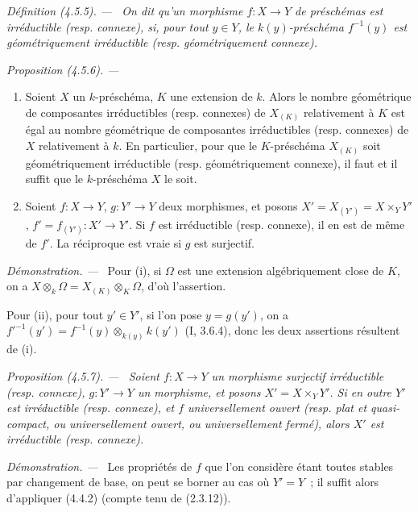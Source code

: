 \documentclass[10pt,oneside]{book}
\newenvironment{definition}[1][]{%
  \par\medskip\noindent\itshape Définition (#1). ---\ }{\par}
\newenvironment{proposition}[1][]{%
  \par\medskip\noindent\itshape Proposition (#1). ---\ }{\par}
\newenvironment{proof}{%
  \par\medskip\noindent\textit{Démonstration. ---\ }}{\par}
\begin{document}
\begin{definition}[4.5.5]
\label{IV.2.4.5.5-fr}
On dit qu'un morphisme $f:X\to Y$ de préschémas est \emph{irréductible}
(resp. \emph{connexe}), si, pour tout $y\in Y$, le $k(y)$-préschéma
$f^{-1}(y)$ est géométriquement irréductible (resp. géométriquement connexe).
\end{definition}

\begin{proposition}[4.5.6]
\label{IV.2.4.5.6-fr}
\begin{enumerate}
\item[(i)] Soient $X$ un $k$-préschéma, $K$ une extension de $k$. Alors le
nombre géométrique de composantes irréductibles (resp. connexes) de $X_{(K)}$
relativement à $K$ est égal au nombre géométrique de composantes irréductibles
(resp. connexes) de $X$ relativement à $k$. En particulier, pour que le
$K$-préschéma $X_{(K)}$ soit géométriquement irréductible (resp.
géométriquement connexe), il faut et il suffit que le $k$-préschéma $X$ le
soit.
\item[(ii)] Soient $f:X\to Y$, $g:Y'\to Y$ deux morphismes, et posons
$X'=X_{(Y')}=X\times_Y Y'$, $f'=f_{(Y')}:X'\to Y'$. Si $f$ est irréductible
(resp. connexe), il en est de même de $f'$. La réciproque est vraie si $g$ est
surjectif.
\end{enumerate}
\end{proposition}

\begin{proof}
Pour (i), si $\Omega$ est une extension algébriquement close de $K$, on a
$X\otimes_k\Omega=X_{(K)}\otimes_K\Omega$, d'où l'assertion.

Pour (ii), pour tout $y'\in Y'$, si l'on pose $y=g(y')$, on a
$f'^{-1}(y')=f^{-1}(y)\otimes_{k(y)}k(y')$ (I, 3.6.4), donc les deux assertions
résultent de (i).
\end{proof}

\begin{proposition}[4.5.7]
\label{IV.2.4.5.7-fr}
Soient $f:X\to Y$ un morphisme surjectif irréductible (resp. connexe),
$g:Y'\to Y$ un morphisme, et posons $X'=X\times_Y Y'$. Si en outre $Y'$ est
irréductible (resp. connexe), et $f$ universellement ouvert (resp. plat et
quasi-compact, ou universellement ouvert, ou universellement fermé), alors
$X'$ est irréductible (resp. connexe).
\end{proposition}

\begin{proof}
Les propriétés de $f$ que l'on considère étant toutes stables par changement
de base, on peut se borner au cas où $Y'=Y$~; il suffit alors d'appliquer
(4.4.2) (compte tenu de (2.3.12)).
\end{proof}
\end{document}
